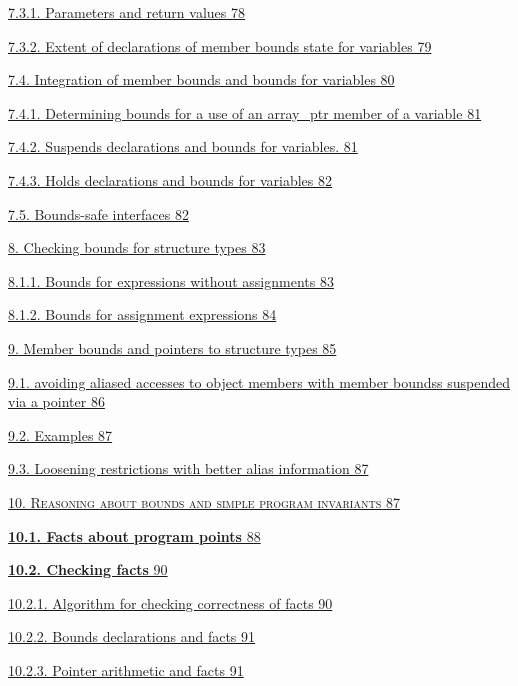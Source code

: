 \documentclass[]{article}
\begin{document}
\protect\hyperlink{ux5fToc440551922}{7.3.1. Parameters and return values
78}

\protect\hyperlink{ux5fToc440551923}{7.3.2. Extent of declarations of
member bounds state for variables 79}

\protect\hyperlink{ux5fToc440551924}{7.4. Integration of member bounds
and bounds for variables 80}

\protect\hyperlink{ux5fToc440551925}{7.4.1. Determining bounds for a use
of an array\_ptr member of a variable 81}

\protect\hyperlink{ux5fToc440551926}{7.4.2. Suspends declarations and
bounds for variables. 81}

\protect\hyperlink{ux5fToc440551927}{7.4.3. Holds declarations and
bounds for variables 82}

\protect\hyperlink{ux5fToc440551928}{7.5. Bounds-safe interfaces 82}

\protect\hyperlink{ux5fToc440551929}{8. Checking bounds for structure
types 83}

\protect\hyperlink{ux5fToc440551930}{8.1.1. Bounds for expressions
without assignments 83}

\protect\hyperlink{ux5fToc440551931}{8.1.2. Bounds for assignment
expressions 84}

\protect\hyperlink{ux5fToc440551932}{9. Member bounds and pointers to
structure types 85}

\protect\hyperlink{ux5fToc440551933}{9.1. avoiding aliased accesses to
object members with member boundss suspended via a pointer 86}

\protect\hyperlink{ux5fToc440551934}{9.2. Examples 87}

\protect\hyperlink{ux5fToc440551935}{9.3. Loosening restrictions with
better alias information 87}

\protect\hyperlink{ux5fToc440551936}{\textsc{10. Reasoning about bounds
and simple program invariants} 87}

\protect\hyperlink{ux5fToc440551937}{\textbf{10.1. Facts about program
points} 88}

\protect\hyperlink{ux5fToc440551938}{\textbf{10.2. Checking facts} 90}

\protect\hyperlink{ux5fToc440551939}{10.2.1. Algorithm for checking
correctness of facts 90}

\protect\hyperlink{ux5fToc440551940}{10.2.2. Bounds declarations and
facts 91}

\protect\hyperlink{ux5fToc440551941}{10.2.3. Pointer arithmetic and
facts 91}
\end{document}
